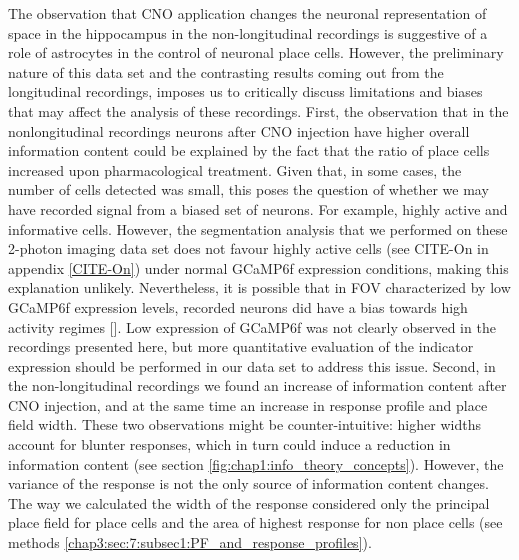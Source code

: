 The observation that CNO application changes the neuronal representation of space in the hippocampus in the non-longitudinal recordings is suggestive of a role of astrocytes in the control of neuronal place cells. 
However, the preliminary nature of this data set and the contrasting results coming out from the longitudinal recordings, imposes us to critically discuss limitations and biases that may affect the analysis of these recordings. 
First, the observation that in the nonlongitudinal recordings neurons after CNO injection have higher overall information content could be explained by the fact that the ratio of place cells increased upon pharmacological treatment. 
Given that, in some cases, the number of cells detected was small, this poses the question of whether we may have recorded signal from a biased set of neurons. 
For example, highly active and informative cells.
However, the segmentation analysis that we performed on these 2-photon imaging data set does not favour highly active cells (see CITE-On in appendix \ref{CITE-On}) under normal GCaMP6f expression conditions, making this explanation unlikely.
Nevertheless, it is possible that in FOV characterized by low GCaMP6f expression levels, recorded neurons did have a bias towards high activity regimes [\cite{harris2016improving}]. 
Low expression of GCaMP6f was not clearly observed in the recordings presented here, but more quantitative evaluation of the indicator expression should be performed in our data set to address this issue. 
Second, in the non-longitudinal recordings we found an increase of information content after CNO injection, and at the same time an increase in response profile and place field width. 
These two observations might be counter-intuitive: higher widths account for blunter responses, which in turn could induce a reduction in information content (see section \ref{fig:chap1:info_theory_concepts}). 
However, the variance of the response is not the only source of information content changes.
The way we calculated the width of the response considered only the principal place field for place cells and the area of highest response for non place cells (see methods \ref{chap3:sec:7:subsec1:PF_and_response_profiles}). 
